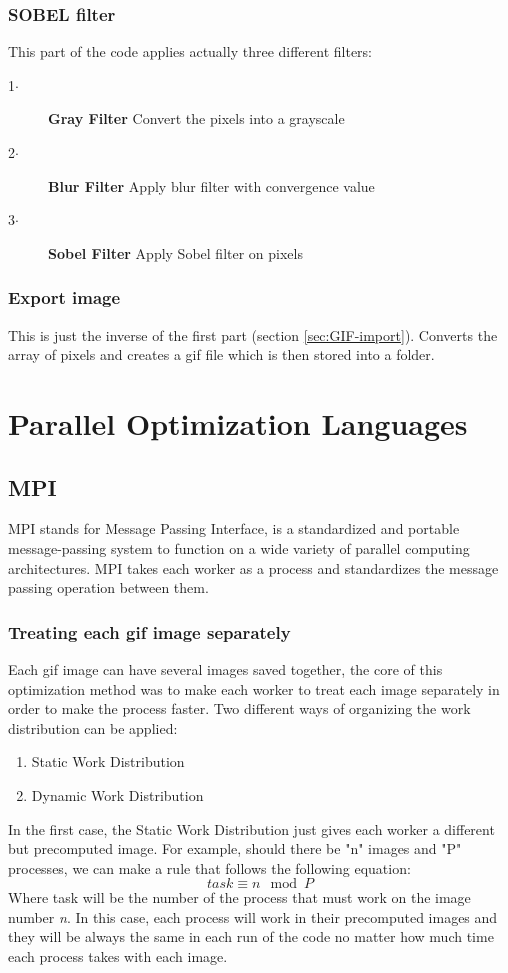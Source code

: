\documentclass[conference,compsoc]{IEEEtran}
\begin{document}
\subsubsection{SOBEL filter}\label{sec:SOBEL-filter}
This part of the code applies actually three different filters:
\begin{description}
	\item[1$\cdot$] \textbf{Gray Filter} Convert the pixels into a grayscale
	\item[2$\cdot$] \textbf{Blur Filter} Apply blur filter with convergence value
	\item[3$\cdot$] \textbf{Sobel Filter} Apply Sobel filter on pixels
\end{description}

\subsubsection{Export image}\label{sec:Export-image}
This is just the inverse of the first part (section \ref{sec:GIF-import}). Converts the array of pixels and creates a gif file which is then stored into a folder.

\section{Parallel Optimization Languages}
\subsection{MPI} \label{sec:MPI}
MPI stands for Message Passing Interface, is a standardized and portable message-passing system to function on a wide variety of parallel computing architectures. MPI takes each worker as a process and standardizes the message passing operation between them.
\subsubsection{Treating each gif image separately} \label{sec:treating-each-image-sep}
Each gif image can have several images saved together, the core of this optimization method was to make each worker to treat each image separately in order to make the process faster.
Two different ways of organizing the work distribution can be applied:
\begin{enumerate}
	\item Static Work Distribution
	\item Dynamic Work Distribution
\end{enumerate}
In the first case, the Static Work Distribution just gives each worker a different but precomputed image. For example, should there be "n" images and "P" processes, we can make a rule that follows the following equation:
\begin{equation}
task \equiv n \mod P
\end{equation} 
Where task will be the number of the process that must work on the image number \textit{n}. In this case, each process will work in their precomputed images and they will be always the same in each run of the code no matter how much time each process takes with each image.
\end{document}
